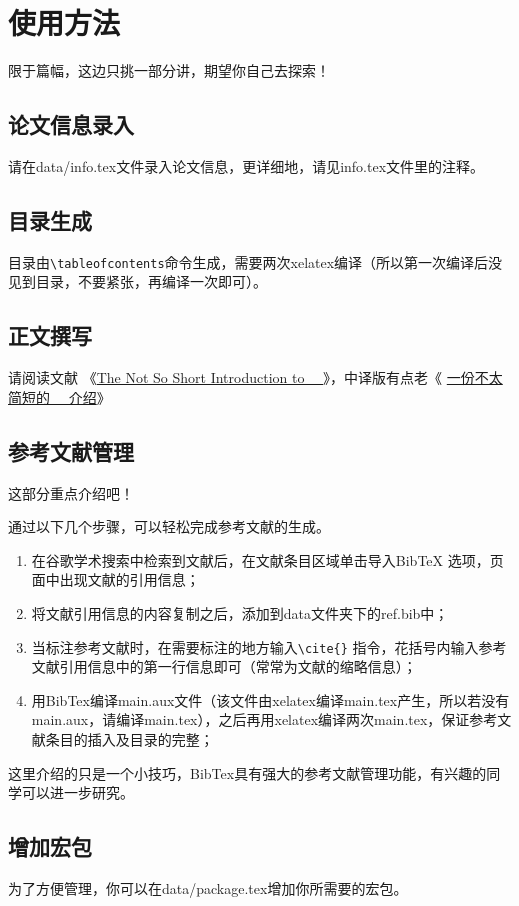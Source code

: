 \chapter{使用方法}
限于篇幅，这边只挑一部分讲，期望你自己去探索！
\section{论文信息录入}
请在data/info.tex文件录入论文信息，更详细地，请见info.tex文件里的注释。
\section{目录生成}
目录由\verb|\tableofcontents|命令生成，需要两次xelatex编译（所以第一次编译后没见到目录，不要紧张，再编译一次即可）。
\section{正文撰写}
请阅读文献 《\href{http://mirrors.ustc.edu.cn/CTAN/info/lshort/english/lshort.pdf}{The Not So Short Introduction to ~\LaTeXe{}~}》\cite{oetiker1995not}，中译版有点老《 \href{http://mirrors.hustunique.com/CTAN/info/lshort/chinese/lshort-zh-cn.pdf}{一份不太简短的~\LaTeXe{}~ 介绍}》
\section{参考文献管理}
这部分重点介绍吧！\par
通过以下几个步骤，可以轻松完成参考文献的生成。\par
\begin{enumerate}
  \item 在谷歌学术搜索中检索到文献后，在文献条目区域单击导入BibTeX 选项，页面中出现文献的引用信息；
  \item 将文献引用信息的内容复制之后，添加到data文件夹下的ref.bib中；
  \item 当标注参考文献时，在需要标注的地方输入\verb|\cite{}| 指令，花括号内输入参考文献引用信息中的第一行信息即可（常常为文献的缩略信息）；
  \item 用BibTex编译main.aux文件（该文件由xelatex编译main.tex产生，所以若没有main.aux，请编译main.tex），之后再用xelatex编译两次main.tex，保证参考文献条目的插入及目录的完整；
\end{enumerate}
\par
这里介绍的只是一个小技巧，BibTex具有强大的参考文献管理功能，有兴趣的同学可以进一步研究。
\section{增加宏包}
为了方便管理，你可以在data/package.tex增加你所需要的宏包。
